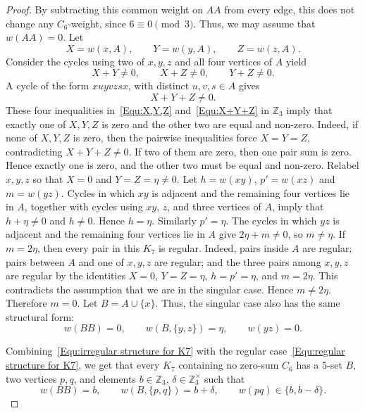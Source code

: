 \documentclass[11pt]{article}
\theoremstyle{remark}
\newcommand{\Z}{\mathbb Z}
\begin{document}
\begin{proof}
    By subtracting this common weight on $AA$ from every edge, this does not change any $C_6$-weight, since $6\equiv0\pmod3$.
    Thus, we may assume that $w(AA)=0$.
    Let
    \[
        X=w(x,A),
        \qquad
        Y=w(y,A),
        \qquad
        Z=w(z,A).
    \]
    Consider the cycles using two of $x,y,z$ and all four vertices of $A$ yield
    \begin{equation}\label{Equ:X,Y,Z}
        X+Y\ne0,
        \qquad
        X+Z\ne0,
        \qquad
        Y+Z\ne0.
    \end{equation}
    A cycle of the form $xuyvzsx$, with distinct $u,v,s\in A$ gives
    \begin{equation}\label{Equ:X+Y+Z}
        X+Y+Z\ne0.
    \end{equation}
    These four inequalities in~\eqref{Equ:X,Y,Z} and~\eqref{Equ:X+Y+Z} in $\Z_3$ imply that exactly one of $X,Y,Z$ is zero and the other two are equal and non-zero.
    Indeed, if none of $X,Y,Z$ is zero, then the pairwise inequalities force $X=Y=Z$, contradicting $X+Y+Z\ne0$.  If two of them are zero, then one pair sum is zero.  Hence exactly one is zero, and the other two must be equal and non-zero.
    Relabel $x,y,z$ so that $X=0$ and $Y=Z=\eta\ne0$.
    Let $h=w(xy)$, $p'=w(xz)$ and $m=w(yz)$.
    Cycles in which $xy$ is adjacent and the remaining four vertices lie in $A$, together with cycles using $xy$, $z$, and three vertices of $A$, imply that $h+\eta\ne0$ and $h\ne0$.
    Hence $h=\eta$.
    Similarly $p'=\eta$.
    The cycles in which $yz$ is adjacent and the remaining four vertices lie in $A$ give $2\eta+m\ne0$, so $m\ne\eta$.  If $m=2\eta$, then every pair in this $K_7$ is regular.  Indeed, pairs inside $A$ are regular; pairs between $A$ and one of $x,y,z$ are regular; and the three pairs among $x,y,z$ are regular by the identities $X=0$, $Y=Z=\eta$, $h=p'=\eta$, and $m=2\eta$.  This contradicts the assumption that we are in the singular case.  Hence $m\ne2\eta$.
    Therefore $m=0$.
    Let $B=A\cup\{x\}$.
    Thus, the singular case also has the same structural form:
    \begin{equation}\label{Equ:irregular structure for K7}
        w(BB)=0,
        \qquad
        w(B,\{y,z\})=\eta,
        \qquad
        w(yz)=0.
    \end{equation}

    Combining~\eqref{Equ:irregular structure for K7} with the regular case~\eqref{Equ:regular structure for K7}, we get that every $K_7$ containing no zero-sum $C_6$ has a $5$-set $B$, two vertices $p,q$, and elements $b\in\Z_3$, $\delta\in\Z_3^\times$ such that
    \begin{equation}\label{Equ:structure for K7}
        w(BB)=b,
        \qquad
        w(B,\{p,q\})=b+\delta,
        \qquad
        w(pq)\in\{b,b-\delta\}.
    \end{equation}


\end{proof}
\end{document}

